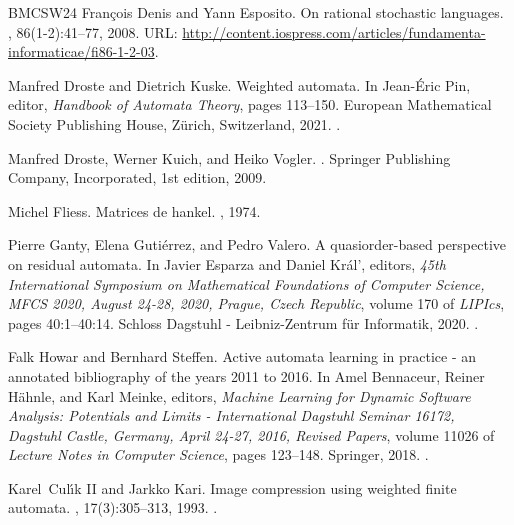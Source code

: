 \documentclass[10pt,a4paper]{amsart}
\theoremstyle{definition}
\numberwithin{equation}{section}
\numberwithin{theorem}{section}
\begin{document}
\begin{thebibliography}{BMCSW24}
Fran{\c{c}}ois Denis and Yann Esposito.
\newblock On rational stochastic languages.
, 86(1-2):41--77, 2008.
\newblock URL:
  \url{http://content.iospress.com/articles/fundamenta-informaticae/fi86-1-2-03}.

Manfred Droste and Dietrich Kuske.
\newblock Weighted automata.
\newblock In Jean{-}{\'{E}}ric Pin, editor, {\em Handbook of Automata Theory},
  pages 113--150. European Mathematical Society Publishing House, Z{\"{u}}rich,
  Switzerland, 2021.
\newblock \href {https://doi.org/10.4171/Automata-1/4}
  {}.

Manfred Droste, Werner Kuich, and Heiko Vogler.
.
\newblock Springer Publishing Company, Incorporated, 1st edition, 2009.

Michel Fliess.
\newblock Matrices de hankel.
, 1974.

Pierre Ganty, Elena Guti{\'{e}}rrez, and Pedro Valero.
\newblock A quasiorder-based perspective on residual automata.
\newblock In Javier Esparza and Daniel Kr{\'{a}}l', editors, {\em 45th
  International Symposium on Mathematical Foundations of Computer Science,
  {MFCS} 2020, August 24-28, 2020, Prague, Czech Republic}, volume 170 of {\em
  LIPIcs}, pages 40:1--40:14. Schloss Dagstuhl - Leibniz-Zentrum f{\"{u}}r
  Informatik, 2020.
\newblock \href {https://doi.org/10.4230/LIPIcs.MFCS.2020.40}
  {}.

Falk Howar and Bernhard Steffen.
\newblock Active automata learning in practice - an annotated bibliography of
  the years 2011 to 2016.
\newblock In Amel Bennaceur, Reiner H{\"{a}}hnle, and Karl Meinke, editors,
  {\em Machine Learning for Dynamic Software Analysis: Potentials and Limits -
  International Dagstuhl Seminar 16172, Dagstuhl Castle, Germany, April 24-27,
  2016, Revised Papers}, volume 11026 of {\em Lecture Notes in Computer
  Science}, pages 123--148. Springer, 2018.
\newblock \href {https://doi.org/10.1007/978-3-319-96562-8\_5}
  {}.

Karel~Cul{\'{\i}}k II and Jarkko Kari.
\newblock Image compression using weighted finite automata.
, 17(3):305--313, 1993.
\newblock \href {https://doi.org/10.1016/0097-8493(93)90079-O}
  {}.


\end{thebibliography}
\end{document}
